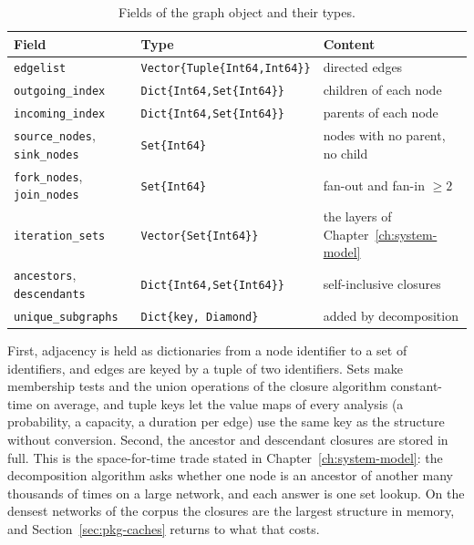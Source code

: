 \documentclass[12pt]{report}
\begin{document}
\begin{table}[htbp]
\centering
\caption{Fields of the graph object and their types.}
\label{tab:pkg-graph-fields}
\small
\renewcommand{\arraystretch}{1.15}
\begin{tabular}{lll}
\toprule
Field & Type & Content \\
\midrule
\texttt{edgelist} & \texttt{Vector\{Tuple\{Int64,Int64\}\}} & directed edges \\
\texttt{outgoing\_index} & \texttt{Dict\{Int64,Set\{Int64\}\}} & children of each node \\
\texttt{incoming\_index} & \texttt{Dict\{Int64,Set\{Int64\}\}} & parents of each node \\
\texttt{source\_nodes}, \texttt{sink\_nodes} & \texttt{Set\{Int64\}} & nodes with no parent, no child \\
\texttt{fork\_nodes}, \texttt{join\_nodes} & \texttt{Set\{Int64\}} & fan-out and fan-in $\ge 2$ \\
\texttt{iteration\_sets} & \texttt{Vector\{Set\{Int64\}\}} & the layers of Chapter~\ref{ch:system-model} \\
\texttt{ancestors}, \texttt{descendants} & \texttt{Dict\{Int64,Set\{Int64\}\}} & self-inclusive closures \\
\texttt{unique\_subgraphs} & \texttt{Dict\{key, Diamond\}} & added by decomposition \\
\bottomrule
\end{tabular}
\end{table}

First, adjacency is held as dictionaries from a node identifier to a set of identifiers, and
edges are keyed by a tuple of two identifiers. Sets make membership tests and the union
operations of the closure algorithm constant-time on average, and tuple keys let the value
maps of every analysis (a probability, a capacity, a duration per edge) use the same key as
the structure without conversion. Second, the ancestor and descendant closures are stored in
full. This is the space-for-time trade stated in Chapter~\ref{ch:system-model}: the
decomposition algorithm asks whether one node is an ancestor of another many thousands of
times on a large network, and each answer is one set lookup. On the densest networks of the
corpus the closures are the largest structure in memory, and Section~\ref{sec:pkg-caches}
returns to what that costs.
\end{document}
